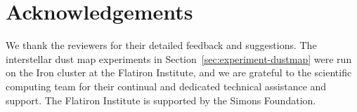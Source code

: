 \section*{Acknowledgements}
We thank the reviewers for their detailed feedback and suggestions. 
The interstellar dust map experiments in Section~\ref{sec:experiment-dustmap} were run on the Iron cluster at the Flatiron Institute, and we are grateful to the scientific computing team for their continual and dedicated technical assistance and support. The Flatiron Institute is supported by the Simons Foundation.